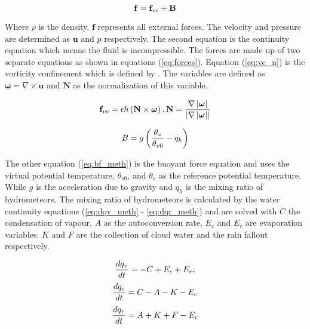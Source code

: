 \begin{equation} \label{eq:forces}
  \centering
  \mathbf{f} = \mathbf{f}_{vc} + \mathbf{B}
\end{equation}

Where $\rho$ is the density, $\mathbf{f}$ represents all external forces.
The velocity and pressure are determined as $\mathbf{u}$ and $p$ respectively.
The second equation is the continuity equation which means the fluid is incompressible.
The forces are made up of two separate equations as shown in equations (\ref{eq:forces}).
Equation (\ref{eq:vc_n}) is the vorticity confinement which is defined by \citet{HarrisEtAl03}.
The variables are defined as $\boldsymbol{\omega} = \nabla\times\mathbf{u}$ and $\mathbf{N}$ as the normalization of this variable. 

\begin{equation} \label{eq:vc_n}
  \centering
  \mathbf{f}_{vc} = \epsilon h\left(\mathbf{N}\times\boldsymbol{\omega}\right), \mathbf{N} = \frac{\nabla\left|\boldsymbol{\omega}\right|}{\left|\nabla\left|\boldsymbol{\omega}\right|\right|}
\end{equation}

\begin{equation} \label{eq:bf_meth}
  \centering
  B = g\left(\frac{\theta_{v}}{\theta_{v0}} - q_{h}\right)
\end{equation}

The other equation (\ref{eq:bf_meth}) is the buoyant force equation and uses the virtual potential temperature, $\theta_{v0}$, and $\theta_{v}$ as the reference potential temperature.
While $g$ is the acceleration due to gravity and $q_{h}$ is the mixing ratio of hydrometeors.
The mixing ratio of hydrometeors is calculated by the water continuity equations (\ref{eq:dqv_meth} - \ref{eq:dqr_meth}) and are solved with $C$ the condensation of vapour, $A$ as the autoconversion rate, $E_{c}$ and $E_{r}$ are evaporation variables.
$K$ and $F$ are the collection of cloud water and the rain fallout respectively.

\begin{equation} \label{eq:dqv_meth}
  \centering
  \frac{dq_{v}}{dt} = - C + E_{c} + E_{r}, 
\end{equation}
\begin{equation} \label{eq:dqc_meth}
  \centering
  \frac{dq_{c}}{dt} = C - A - K - E_{c}
\end{equation}
\begin{equation} \label{eq:dqr_meth}
  \centering
  \frac{dq_{r}}{dt} = A + K + F - E_{r}
\end{equation}

